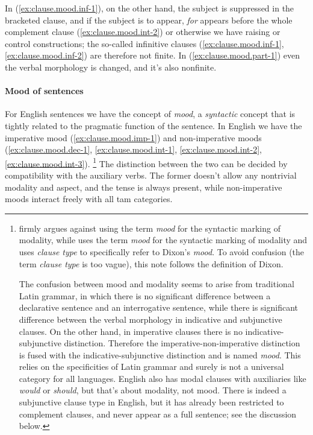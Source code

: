 \documentclass[UTF8, a4paper, oneside, scheme=plain, 12pt]{ctexbook}
\newcommand*{\term}[1]{\emph{#1}}
\newcommand{\form}[1]{\emph{#1}}
\begin{document}
In (\ref{ex:clause.mood.inf-1}), on the other hand, 
the subject is suppressed in the bracketed clause, 
and if the subject is to appear, 
\form{for} appears before the whole complement clause (\ref{ex:clause.mood.int-2})
or otherwise we have raising or control constructions;
the so-called infinitive clauses (\ref{ex:clause.mood.inf-1},\ref{ex:clause.mood.inf-2}) 
are therefore not finite.
In (\ref{ex:clause.mood.part-1}) even the verbal morphology is changed, 
and it's also nonfinite.

\paragraph*{Mood of sentences} For English sentences we have the concept of \term{mood}, 
a \emph{syntactic} concept that is tightly related to the pragmatic function of the sentence.
In English we have the imperative mood (\ref{ex:clause.mood.imp-1})
and non-imperative moods (\ref{ex:clause.mood.dec-1}, 
\ref{ex:clause.mood.int-1}, 
\ref{ex:clause.mood.int-2},
\ref{ex:clause.mood.int-3}).%
\footnote{
    \citet{dixon2009basic1} firmly argues against using the term \term{mood} 
    for the syntactic marking of modality,
    while \citet{cgel} uses the term \term{mood} for the syntactic marking of modality
    and uses \term{clause type} to specifically refer to Dixon's \term{mood}.
    To avoid confusion (the term \term{clause type} is too vague),
    this note follows the definition of Dixon.

    The confusion between mood and modality seems to arise from traditional Latin grammar,
    in which there is no significant difference 
    between a declarative sentence and an interrogative sentence, 
    while there is significant difference
    between the verbal morphology in indicative and subjunctive clauses.
    On the other hand, in imperative clauses 
    there is no indicative-subjunctive distinction.
    Therefore the imperative-non-imperative distinction is fused with 
    the indicative-subjunctive distinction 
    and is named \term{mood}.
    This relies on the specificities of Latin grammar 
    and surely is not a universal category for all languages.
    English also has modal clauses with auxiliaries like \form{would} or \form{should},
    but that's about modality, not mood.
    There is indeed a subjunctive clause type in English,
    but it has already been restricted to complement clauses,
    and never appear as a full sentence; see the discussion below. 
}
The distinction between the two can be decided by compatibility with the auxiliary verbs.
The former doesn't allow any nontrivial modality and aspect,
and the tense is always present,
while non-imperative moods interact freely with all \acs{tam} categories.
\end{document}
